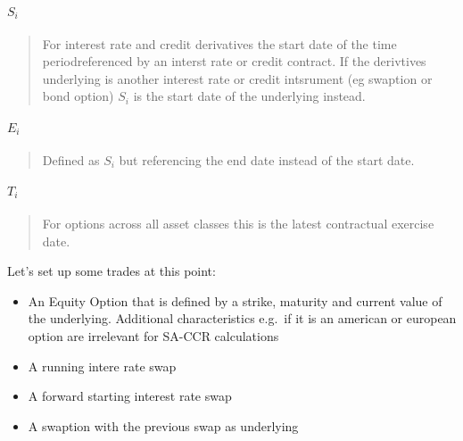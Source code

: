 \hypertarget{s_i}{%
\paragraph{\texorpdfstring{\(S_i\)}{S\_i}}\label{s_i}}

\begin{quote}
For interest rate and credit derivatives the start date of the time
periodreferenced by an interst rate or credit contract. If the
derivtives underlying is another interest rate or credit intsrument (eg
swaption or bond option) \(S_i\) is the start date of the underlying
instead.
\end{quote}

\hypertarget{e_i}{%
\paragraph{\texorpdfstring{\(E_i\)}{E\_i}}\label{e_i}}

\begin{quote}
Defined as \(S_i\) but referencing the end date instead of the start
date.
\end{quote}

\hypertarget{t_i}{%
\paragraph{\texorpdfstring{\(T_i\)}{T\_i}}\label{t_i}}

\begin{quote}
For options across all asset classes this is the latest contractual
exercise date.
\end{quote}

    Let's set up some trades at this point:

\begin{itemize}
\tightlist
\item
  An Equity Option that is defined by a strike, maturity and current
  value of the underlying. Additional characteristics e.g.~if it is an
  american or european option are irrelevant for SA-CCR calculations
\item
  A running intere rate swap
\item
  A forward starting interest rate swap
\item
  A swaption with the previous swap as underlying
\end{itemize}


